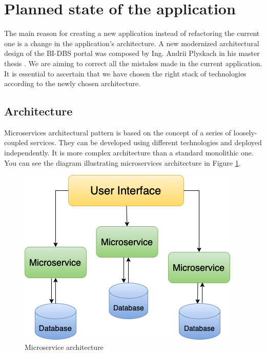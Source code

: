 \section{Planned state of the application}\label{sec13} The main reason for creating a new application instead of refactoring the current one is a change in the application's architecture. A new modernized architectural design of the BI-DBS portal was composed by Ing. Andrii Plyskach in his master thesis \cite{mt-plyskach}. We are aiming to correct all the mistakes made in the current application. It is essential to ascertain that we have chosen the right stack of technologies according to the newly chosen architecture.

\subsection{Architecture}
Microservices architectural pattern \cite{architecture-haris} is based on the concept of a series of loosely-coupled services. They can be developed using different technologies and deployed independently. It is more complex architecture than a standard monolithic one. You can see the diagram illustrating microservices architecture in Figure \ref{micr}. 

\begin{figure}[hp]
\centering
\includegraphics[scale=0.67]{../png/microservices.png}
\caption{Microservice architecture}\label{picture:microservices}
\label{micr}
\end{figure}


